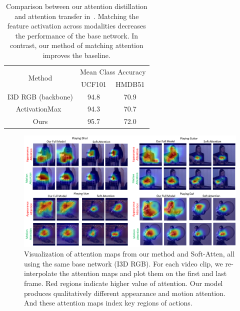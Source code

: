 \documentclass[10pt,twocolumn,letterpaper]{article}
\begin{document}
\begin{table}[t]
\centering
\footnotesize
\begin{tabular}{c|cc}
\multirow{2}{*}{Method}                        & \multicolumn{2}{c}{Mean Class Accuracy} \\
                                               & UCF101   & HMDB51 \\ \hline
I3D RGB (backbone)                             & 94.8     & 70.9   \\
ActivationMax~\cite{Zagoruyko2017AT}           & 94.3     & 70.7   \\
Ours                                           & 95.7     & 72.0   \\ 
\end{tabular}
\vspace{0.1em}
\caption{Comparison between our attention distillation and attention transfer in~\cite{Zagoruyko2017AT}. Matching the feature activation across modalities decreases the performance of the base network. In contrast, our method of matching attention improves the baseline.\vspace{-1em}}
\label{table:transfer}
\end{table}

\begin{figure}[t]
\centering
\includegraphics[width=0.98\linewidth]{figures/vis.pdf}
\caption{Visualization of attention maps from our method and Soft-Atten, all using the same base network (I3D RGB). For each video clip, we re-interpolate the attention maps and plot them on the first and last frame. Red regions indicate higher value of attention. Our model produces qualitatively different appearance and motion attention. And these attention maps index key regions of actions.}
\label{fig:vis}
\vspace{-1em}
\end{figure}
\end{document}
